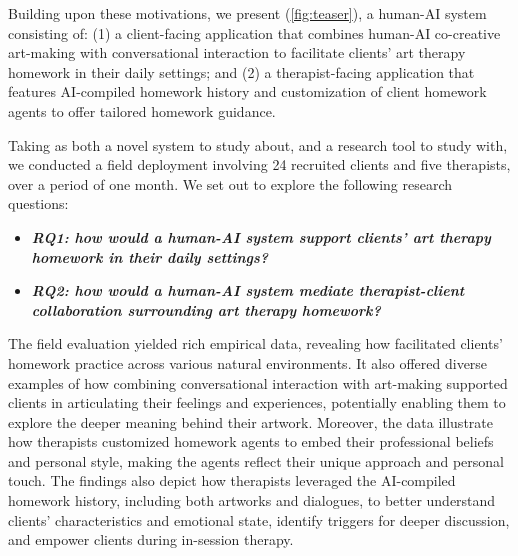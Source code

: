 
Building upon these motivations, we present \name{} (\autoref{fig:teaser}), a human-AI system consisting of: 
(1) a client-facing application that combines human-AI co-creative art-making with conversational interaction to facilitate clients' art therapy homework in their daily settings; 
and (2) a therapist-facing application that features AI-compiled homework history and customization of client homework agents to offer tailored homework guidance.


Taking \name{} as both a novel system to study about, and a research tool to study with, we conducted a field deployment involving 24 recruited clients and five therapists, over a period of one month. We set out to explore the following research questions:

\begin{itemize}
  \item \textbf{\textit{RQ1: how would a human-AI system support clients' art therapy homework in their daily settings?}}
  \item \textbf{\textit{RQ2: how would a human-AI system mediate therapist-client collaboration surrounding art therapy homework?}}
\end{itemize}


The field evaluation yielded rich empirical data, revealing how \name{} facilitated clients' homework practice across various natural environments. It also offered diverse examples of how combining conversational interaction with art-making supported clients in articulating their feelings and experiences, potentially enabling them to explore the deeper meaning behind their artwork. 
Moreover, the data illustrate how therapists customized homework agents to embed their professional beliefs and personal style, making the agents reflect their unique approach and personal touch. The findings also depict how therapists leveraged the AI-compiled homework history, including both artworks and dialogues, to better understand clients' characteristics and emotional state, identify triggers for deeper discussion, and empower clients during in-session therapy.

